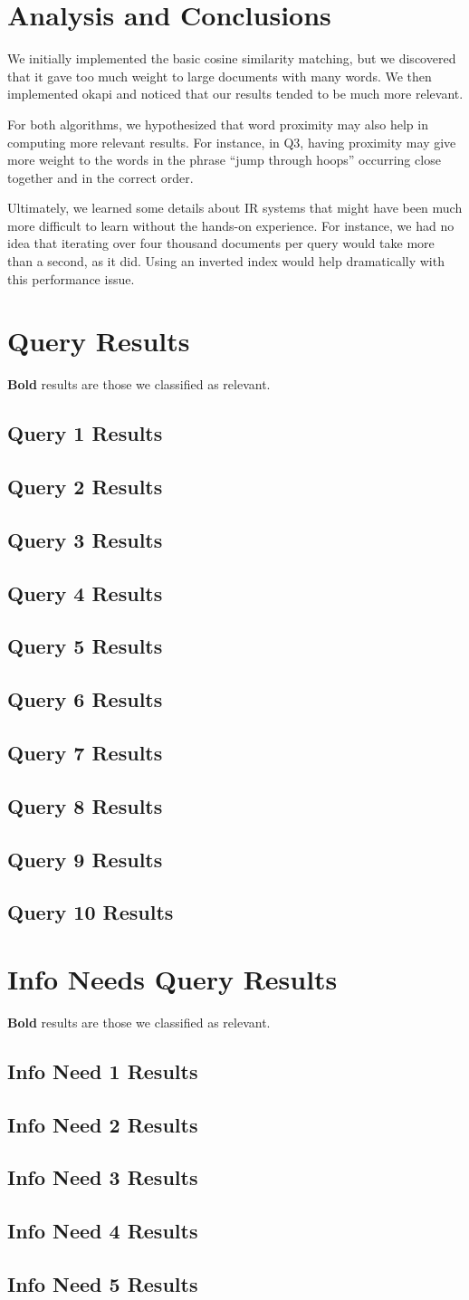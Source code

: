 \documentclass{report}
\newcommand{\results}[2]{\subsection{Query #1 Results}\begin{list}{}{}\end{list}}
\newcommand{\needresults}[2]{\subsection{Info Need #1 Results}\begin{list}{}{}\end{list}}
\newcommand{\okapi}{okapi }
\newcommand{\cosine}{cosine similarity }
\begin{document}
\section{Analysis and Conclusions}
We initially implemented the basic \cosine matching, but we discovered
that it gave too much weight to large documents with many words. We
then implemented \okapi and noticed that our results tended to be much
more relevant.

For both algorithms, we hypothesized that word proximity may also help
in computing more relevant results. For instance, in Q3, having
proximity may give more weight to the words in the phrase ``jump
through hoops'' occurring close together and in the correct order.

Ultimately, we learned some details about IR systems that might have
been much more difficult to learn without the hands-on experience. For
instance, we had no idea that iterating over four thousand documents
per query would take more than a second, as it did. Using an inverted
index would help dramatically with this performance issue.

\appendix
\section{Query Results}
\textbf{Bold} results are those we classified as relevant.
\label{query-responses}
\results{1}{queryresults01.txt.tex}
\results{2}{queryresults02.txt.tex}
\results{3}{queryresults03.txt.tex}
\results{4}{queryresults04.txt.tex}
\results{5}{queryresults05.txt.tex}
\results{6}{queryresults06.txt.tex}
\results{7}{queryresults07.txt.tex}
\results{8}{queryresults08.txt.tex}
\results{9}{queryresults09.txt.tex}
\results{10}{queryresults10.txt.tex}
\section{Info Needs Query Results}
\label{need-responses}
\textbf{Bold} results are those we classified as relevant.
\needresults{1}{InfoNeed01.txt.tex}
\needresults{2}{InfoNeed02.txt.tex}
\needresults{3}{InfoNeed03.txt.tex}
\needresults{4}{InfoNeed04.txt.tex}
\needresults{5}{InfoNeed05.txt.tex}
\end{document}

